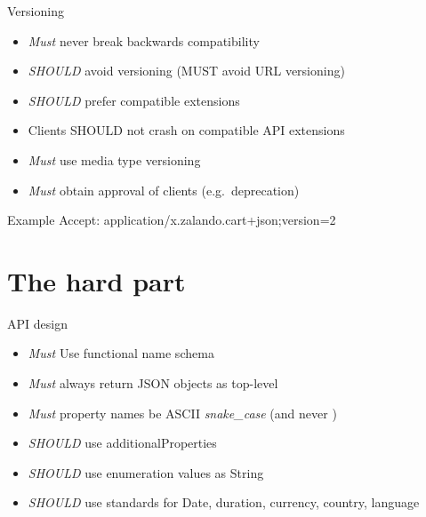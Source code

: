\documentclass[10pt]{beamer}
\begin{document}
\begin{frame}{Versioning}
  \begin{itemize}
    \item \emph{Must} never break backwards compatibility
    \item \emph{SHOULD} avoid versioning (MUST avoid URL versioning)
    \item \emph{SHOULD} prefer compatible extensions
    \item Clients SHOULD not crash on compatible API extensions
    \item \emph{Must} use media type versioning
    \item \emph{Must} obtain approval of clients (e.g.~deprecation)
  \end{itemize}

  \begin{block}{Example}
    Accept: application/x.zalando.cart+json;version=2
  \end{block}
\end{frame}

\section{The hard part}

\begin{frame}{API design}
  \begin{itemize}
    \item \emph{Must} Use functional name schema
    \item \emph{Must} always return JSON objects as top-level
    \item \emph{Must} property names be ASCII \emph{snake\_case} (and never )
    \item \emph{SHOULD} use additionalProperties
    \item \emph{SHOULD} use enumeration values as String
    \item \emph{SHOULD} use standards for Date, duration, currency, country, language
  \end{itemize}
\end{frame}
\end{document}
